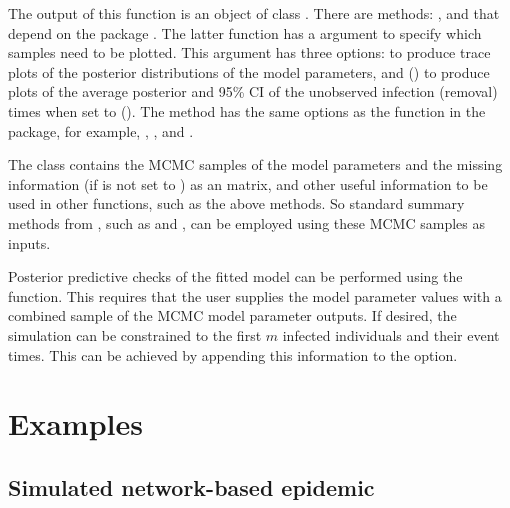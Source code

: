 \documentclass[nojss,shortnames]{jss}
\begin{document}

The output of this function is an object of class . 
There are  methods: ,  and  that depend on the  package \citep{coda}.
The latter function has a  argument to specify which samples need to be plotted. This argument has three options:  to produce trace plots of the posterior distributions of the model parameters, and  () to produce plots of the average posterior and 95\% CI of the unobserved infection (removal) times when  set to  (). The   method has the same options as the  function in the  package, for example, , , and .

The class  contains the MCMC samples of the model parameters and the missing information (if  is not set to ) as an  matrix, and other useful information to be used in other functions, such as the above  methods. So standard summary methods from , such as  and , can be employed using these MCMC samples as inputs.

Posterior predictive checks of the fitted model can be performed using the  function. This requires that the user supplies the model parameter values with a combined sample of the MCMC model parameter outputs. If desired, the simulation can be constrained to the first $m$ infected individuals and their event times. This can be achieved by appending this information to the  option. 

\section{Examples}

\subsection{Simulated network-based epidemic}
\end{document}

